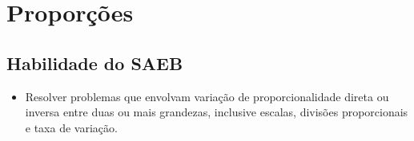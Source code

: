 
\chapter{Proporções}

\section*{Habilidade do SAEB} 
\begin{itemize}
\item Resolver problemas que envolvam variação de
proporcionalidade direta ou inversa entre duas ou mais grandezas,
inclusive escalas, divisões proporcionais e taxa de variação.
\end{itemize}


